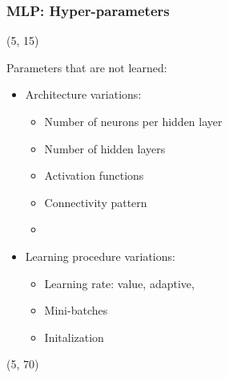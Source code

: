 \begin{frame}
  \frametitle{\acl{MLP}: Hyper-parameters}

  \begin{textblock}{90}(5, 15)
    \begin{block}{Parameters that are not learned:}
      \begin{itemize}
      \item<1-> Architecture variations:
        \begin{itemize}
        \item Number of neurons per hidden layer
        \item Number of hidden layers
        \item Activation functions
        \item Connectivity pattern
        \item \etc{}
        \end{itemize}
      \item<2-> Learning procedure variations:
        \begin{itemize}
        \item Learning rate: value, adaptive, \etc{}
        \item Mini-batches
        \item Initalization
        \end{itemize}
      \end{itemize}
    \end{block}
  \end{textblock}

  \begin{textblock}{90}(5, 70)
  \end{textblock}
\end{frame}


